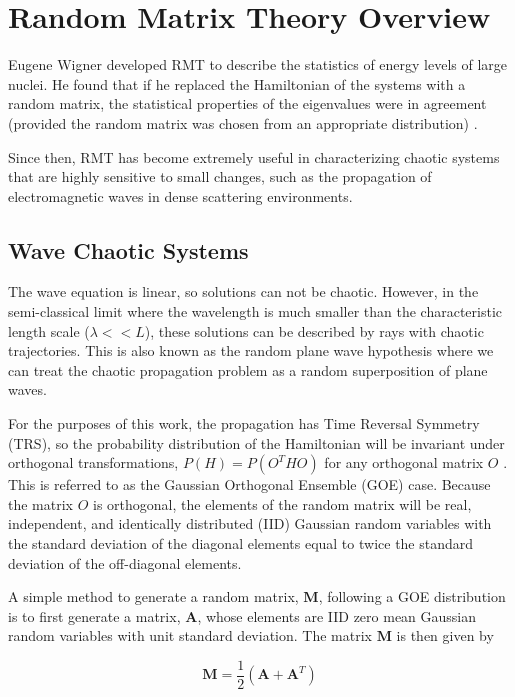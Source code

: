 \renewcommand{\baselinestretch}{2} \small\normalsize
\section{Random Matrix Theory Overview}
Eugene Wigner developed RMT to describe the statistics of energy levels of large nuclei. He found that if he replaced the Hamiltonian of the systems with a random matrix, the statistical properties of the eigenvalues were in agreement (provided the random matrix was chosen from an appropriate distribution) \cite{ott_chaos}.

Since then, RMT has become extremely useful in characterizing chaotic systems that are highly sensitive to small changes, such as the propagation of electromagnetic waves in dense scattering environments.

\subsection{Wave Chaotic Systems}
The wave equation is linear, so solutions can not be chaotic. However, in the semi-classical limit where the wavelength is much smaller than the characteristic length scale ($\lambda << L$), these solutions can be described by rays with chaotic trajectories. This is also known as the random plane wave hypothesis where we can treat the chaotic propagation problem as a random superposition of plane waves.

For the purposes of this work, the propagation has Time Reversal Symmetry (TRS), so the probability distribution of the Hamiltonian will be invariant under orthogonal transformations, $P(H) = P(O^THO)$ for any orthogonal matrix $O$ \cite{ott_chaos}. This is referred to as the Gaussian Orthogonal Ensemble (GOE) case. Because the matrix $O$ is orthogonal, the elements of the random matrix will be real, independent, and identically distributed (IID) Gaussian random variables with the standard deviation of the diagonal elements equal to twice the standard deviation of the off-diagonal elements.

A simple method to generate a random matrix, $\textbf{M}$, following a GOE distribution is to first generate a matrix, $\textbf{A}$, whose elements are IID zero mean Gaussian random variables with unit standard deviation. The matrix $\textbf{M}$ is then given by

\begin{equation}
\textbf{M} = \frac{1}{2}\left(\textbf{A} + \textbf{A}^T \right)
\label{rmt_eq:000}
\end{equation}
\renewcommand{\baselinestretch}{2} \small\normalsize

